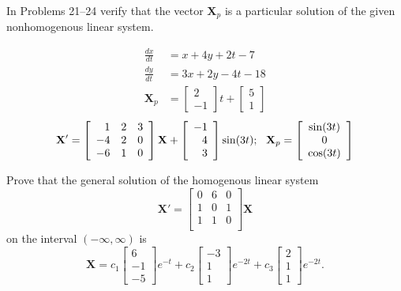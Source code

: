\documentclass[chapter=8,section=1]{math252homework}
\begin{document}
In Problems 21--24 verify that the vector $\mathbf{X}_{p}$ is a particular solution of the given nonhomogenous linear system.
\begin{problems}[start=21]
	\problem \begin{equation*}
	\begin{aligned}
		\frac{dx}{dt} &= x + 4y + 2t - 7\\
		\frac{dy}{dt} &= 3x + 2y - 4t - 18\\
		\mathbf{X}_{p} &= \left[ \begin{array}{r}
			2\\
			-1
		\end{array} \right]t + \left[ \begin{array}{c}
			5\\
			1
		\end{array} \right]
	\end{aligned}
	\end{equation*}			%
	\setcounter{problemsi}{23}
	\problem \[ \mathbf{X'} = \left[ \begin{array}{rcc}
		1 & 2 & 3\\
		-4 & 2 & 0\\
		-6 & 1 & 0\\
	\end{array} \right]\mathbf{X} + \left[ \begin{array}{r}
		-1\\
		4\\
		3
	\end{array} \right]\sin(3t);\mbox{{ }{ }} \mathbf{X}_{p} = \left[ \begin{array}{c}
		\sin(3t)\\
		0\\
		\cos(3t)
	\end{array} \right] \]			%
\end{problems}

\begin{problems}[start=25]
	\problem Prove that the general solution of the homogenous linear system \[ \mathbf{X'} = \left[ \begin{array}{ccc}
		0 & 6 & 0\\
		1 & 0 & 1\\
		1 & 1 & 0\\
	\end{array} \right]\mathbf{X} \] on the interval $(-\infty, \infty)$ is \[ \mathbf{X} = c_{1}\left[ \begin{array}{r}
		6\\
		-1\\
		-5
	\end{array} \right]e^{-t} + c_{2}\left[ \begin{array}{r}
		-3\\
		1\\
		1
	\end{array} \right]e^{-2t} + c_{3}\left[ \begin{array}{r}
		2\\
		1\\
		1
	\end{array} \right]e^{-2t}. \]			%
\end{problems}
\end{document}
